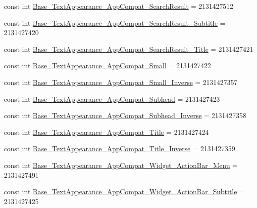 \begin{DoxyCompactItemize}
\item 
const int \mbox{\hyperlink{class_f_w_p_s___app_1_1_droid_1_1_resource_1_1_style_a0c94baea5b114fbdd3d078fd37cf93ab}{Base\+\_\+\+Text\+Appearance\+\_\+\+App\+Compat\+\_\+\+Search\+Result}} = 2131427512
\item 
const int \mbox{\hyperlink{class_f_w_p_s___app_1_1_droid_1_1_resource_1_1_style_aa5b053d4a2197dcaaa52d0f2ca431aaa}{Base\+\_\+\+Text\+Appearance\+\_\+\+App\+Compat\+\_\+\+Search\+Result\+\_\+\+Subtitle}} = 2131427420
\item 
const int \mbox{\hyperlink{class_f_w_p_s___app_1_1_droid_1_1_resource_1_1_style_ac75d7939e0e94ed987d8c27a8619730b}{Base\+\_\+\+Text\+Appearance\+\_\+\+App\+Compat\+\_\+\+Search\+Result\+\_\+\+Title}} = 2131427421
\item 
const int \mbox{\hyperlink{class_f_w_p_s___app_1_1_droid_1_1_resource_1_1_style_a1de6b6e6ba2f6a2b3fcbdaf0d9774cae}{Base\+\_\+\+Text\+Appearance\+\_\+\+App\+Compat\+\_\+\+Small}} = 2131427422
\item 
const int \mbox{\hyperlink{class_f_w_p_s___app_1_1_droid_1_1_resource_1_1_style_a5d1b230fb3ad421833885480ecab9899}{Base\+\_\+\+Text\+Appearance\+\_\+\+App\+Compat\+\_\+\+Small\+\_\+\+Inverse}} = 2131427357
\item 
const int \mbox{\hyperlink{class_f_w_p_s___app_1_1_droid_1_1_resource_1_1_style_a057abeaf264034b5273f42e6d9560dd9}{Base\+\_\+\+Text\+Appearance\+\_\+\+App\+Compat\+\_\+\+Subhead}} = 2131427423
\item 
const int \mbox{\hyperlink{class_f_w_p_s___app_1_1_droid_1_1_resource_1_1_style_a68603b382bbe5f959afe17f9250e9de5}{Base\+\_\+\+Text\+Appearance\+\_\+\+App\+Compat\+\_\+\+Subhead\+\_\+\+Inverse}} = 2131427358
\item 
const int \mbox{\hyperlink{class_f_w_p_s___app_1_1_droid_1_1_resource_1_1_style_a44e36e31951c79f015c8cc8a1e447e58}{Base\+\_\+\+Text\+Appearance\+\_\+\+App\+Compat\+\_\+\+Title}} = 2131427424
\item 
const int \mbox{\hyperlink{class_f_w_p_s___app_1_1_droid_1_1_resource_1_1_style_a0295bb5b19fded66a32a9d8e6655c5f9}{Base\+\_\+\+Text\+Appearance\+\_\+\+App\+Compat\+\_\+\+Title\+\_\+\+Inverse}} = 2131427359
\item 
const int \mbox{\hyperlink{class_f_w_p_s___app_1_1_droid_1_1_resource_1_1_style_a3e489d3d1e5ab4bae257952ea723e701}{Base\+\_\+\+Text\+Appearance\+\_\+\+App\+Compat\+\_\+\+Widget\+\_\+\+Action\+Bar\+\_\+\+Menu}} = 2131427491
\item 
const int \mbox{\hyperlink{class_f_w_p_s___app_1_1_droid_1_1_resource_1_1_style_aa3cef12a23422bee6b29cff43178edfc}{Base\+\_\+\+Text\+Appearance\+\_\+\+App\+Compat\+\_\+\+Widget\+\_\+\+Action\+Bar\+\_\+\+Subtitle}} = 2131427425

\end{DoxyCompactItemize}
